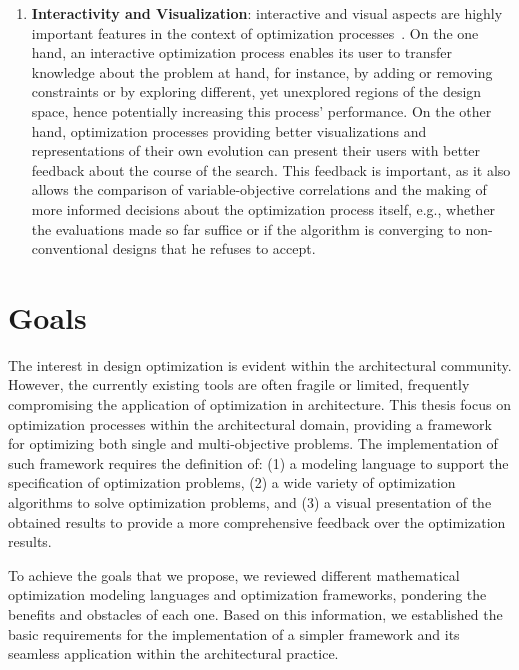 \begin{enumerate}
\item \textbf{Interactivity and Visualization}: interactive and visual aspects are highly important features in the context of optimization processes~\cite{Ashour2015CreativelyMOO}. On the one hand, an interactive optimization process enables its user to transfer knowledge about the problem at hand, for instance, by adding or removing constraints or by exploring different, yet unexplored regions of the design space, hence potentially increasing this process' performance. On the other hand, optimization processes providing better visualizations and representations of their own evolution can present their users with better feedback about the course of the search. This feedback is important, as it also allows the comparison of variable-objective correlations and the making of more informed decisions about the optimization process itself, e.g., whether the evaluations made so far suffice or if the algorithm is converging to non-conventional designs that he refuses to accept.
\end{enumerate}


\section{Goals}
The interest in design optimization is evident within the architectural community. However, the currently existing tools are often fragile or limited, frequently compromising the application of optimization in architecture. This thesis focus on optimization processes within the architectural domain, providing a framework for optimizing both single and multi-objective problems. The implementation of such framework requires the definition of: (1) a modeling language to support the specification of optimization problems, (2) a wide variety of optimization algorithms to solve optimization problems, and (3) a visual presentation of the obtained results to provide a more comprehensive feedback over the optimization results.

To achieve the goals that we propose, we reviewed different mathematical optimization modeling languages and optimization frameworks, pondering the benefits and obstacles of each one. Based on this information, we established the basic requirements for the implementation of a simpler framework and its seamless application within the architectural practice. 

